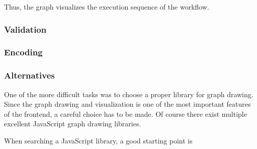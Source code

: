 \documentclass[a4paper,11pt,pdftex,halfparskip,cleardoubleempty,bibtotoc,liststotoc]{scrbook}
\begin{document}
Thus, the graph visualizes the execution sequence of the workflow.


\subsubsection{Validation}

\subsubsection{Encoding}

\subsubsection{Alternatives}

One of the more difficult tasks was to choose a proper library for graph drawing. Since the graph drawing and visualization is one of the most important features of the frontend, a careful choice has to be made. Of course there exist multiple excellent JavaScript graph drawing libraries. 

When searching a JavaScript library, a good starting point is 
\end{document}
